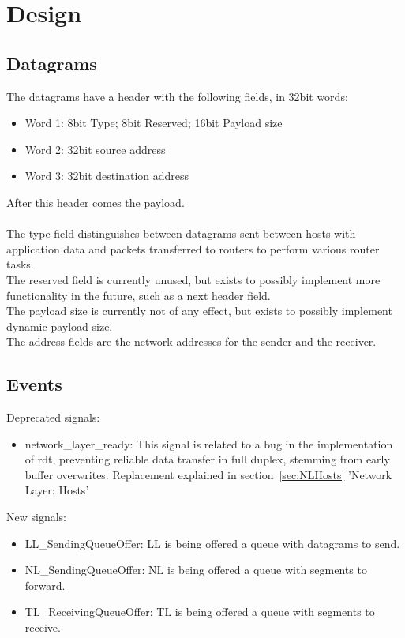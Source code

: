 \section{Design}
\subsection{Datagrams}
The datagrams have a header with the following fields, in 32bit words:
\begin{itemize}
\item Word 1: 8bit Type; 8bit Reserved; 16bit Payload size
\item Word 2: 32bit source address
\item Word 3: 32bit destination address
\end{itemize}

After this header comes the payload.\\
\\
The type field distinguishes between datagrams sent between hosts with application data and packets transferred to routers to perform various router tasks.\\
The reserved field is currently unused, but exists to possibly implement more functionality in the future, such as a next header field.\\
The payload size is currently not of any effect, but exists to possibly implement dynamic payload size.\\
The address fields are the network addresses for the sender and the receiver.

\subsection{Events}
Deprecated signals:
\begin{itemize}
\item network\_layer\_ready: This signal is related to a bug in the implementation of rdt, preventing reliable data transfer in full duplex, stemming from early buffer overwrites. Replacement explained in section~\ref{sec:NLHosts} 'Network Layer: Hosts'
\end{itemize}

New signals:
\begin{itemize}
\item LL\_SendingQueueOffer: LL is being offered a queue with datagrams to send.
\item NL\_SendingQueueOffer: NL is being offered a queue with segments to forward.
\item TL\_ReceivingQueueOffer: TL is being offered a queue with segments to receive.
\end{itemize}

